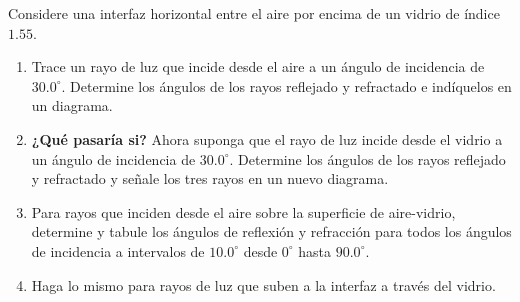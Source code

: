 \item Considere una interfaz horizontal entre el aire por encima de un vidrio de índice $1.55$.
\begin{enumerate}
    \item Trace un rayo de luz que incide desde el aire a un ángulo de incidencia de $30.0^\circ$. Determine los ángulos de los rayos reflejado y refractado e indíquelos en un diagrama.
    \item \textbf{¿Qué pasaría si?} Ahora suponga que el rayo de luz incide desde el vidrio a un ángulo de incidencia de $30.0^\circ$. Determine los ángulos de los rayos reflejado y refractado y señale los tres rayos en un nuevo diagrama.
    \item Para rayos que inciden desde el aire sobre la superficie de aire-vidrio, determine y tabule los ángulos de reflexión y refracción para todos los ángulos de incidencia a intervalos de $10.0^\circ$ desde $0^\circ$ hasta $90.0^\circ$.
    \item Haga lo mismo para rayos de luz que suben a la interfaz a través del vidrio.
\end{enumerate}